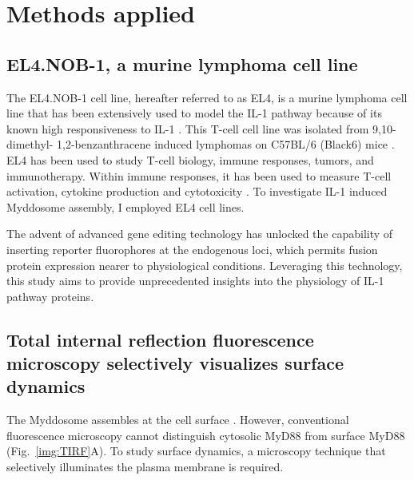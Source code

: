 \chapter{Methods applied}
\label{chapter:methods_applied}
\section{EL4.NOB-1, a murine lymphoma cell line}
\label{section:EL4}
The EL4.NOB-1 cell line, hereafter referred to as EL4, is a murine lymphoma cell line that has been extensively used to model the IL-1 pathway because of its known high responsiveness to IL-1 \autocite{ONeill_1990}\autocite{Boraschi_1996}\autocite{Higgins_2020}. This T-cell cell line was isolated from 9,10-dimethyl- 1,2-benzanthracene induced lymphomas on C57BL/6 (Black6) mice \autocite{Ng_2018}. EL4 has been used to study T-cell biology, immune responses, tumors, and immunotherapy. Within immune responses, it has been used to measure T-cell activation, cytokine production and cytotoxicity \autocite{Siese_1999}. To investigate IL-1 induced Myddosome assembly, I employed EL4 cell lines.

The advent of advanced gene editing technology has unlocked the capability of inserting reporter fluorophores at the endogenous loci, which permits fusion protein expression nearer to physiological conditions. Leveraging this technology, this study aims to provide unprecedented insights into the physiology of IL-1 pathway proteins.

\section{Total internal reflection fluorescence microscopy selectively visualizes surface dynamics}
\label{section:TIRF}
The Myddosome assembles at the cell surface \autocite{Lin_2010}\autocite{Latty_2018}. However, conventional fluorescence microscopy cannot distinguish cytosolic MyD88 from surface MyD88 (Fig.~\ref{img:TIRF}A). To study surface dynamics, a microscopy technique that selectively illuminates the plasma membrane is required.
 
